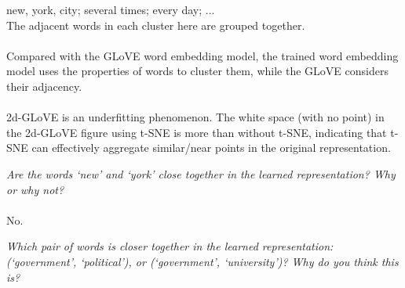 \documentclass{myhw}
\begin{document}
\begin{homeworkProblem}
\begin{homeworkSection}
new, york, city; several times; every day; ... \\
The adjacent words in each cluster here are grouped together. \\
\\
Compared with the GLoVE word embedding model, the trained word embedding model uses the properties of words to cluster them, while the GLoVE considers their adjacency. \\
\\
2d-GLoVE is an underfitting phenomenon. 
The white space (with no point) in the 2d-GLoVE figure using t-SNE is more than without t-SNE, indicating that t-SNE can effectively aggregate similar/near points in the original representation.
\end{homeworkSection}
\begin{homeworkSection}
\emph{Are the words ‘new’ and ‘york’ close together in the learned representation? Why or why not?} \\
\\
No. 
\end{homeworkSection}
\begin{homeworkSection}
\emph{Which pair of words is closer together in the learned representation: (‘government’, ‘political’), or (‘government’, ‘university’)? Why do you think this is?}
\end{homeworkSection}
\end{homeworkProblem}
\end{document}
